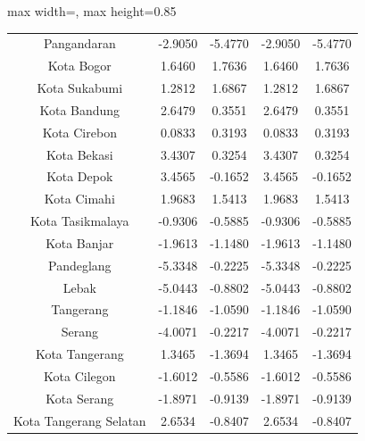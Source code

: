 \begin{table}[H]
\begin{adjustbox}{max width=\textwidth, max height=0.85\textheight}
\begin{tabular}{|c|c|c|c|c|}
Pangandaran & -2.9050 & -5.4770 & -2.9050 & -5.4770 \\
Kota Bogor & 1.6460 & 1.7636 & 1.6460 & 1.7636 \\
Kota Sukabumi & 1.2812 & 1.6867 & 1.2812 & 1.6867 \\
Kota Bandung & 2.6479 & 0.3551 & 2.6479 & 0.3551 \\
Kota Cirebon & 0.0833 & 0.3193 & 0.0833 & 0.3193 \\
Kota Bekasi & 3.4307 & 0.3254 & 3.4307 & 0.3254 \\
Kota Depok & 3.4565 & -0.1652 & 3.4565 & -0.1652 \\
Kota Cimahi & 1.9683 & 1.5413 & 1.9683 & 1.5413 \\
Kota Tasikmalaya & -0.9306 & -0.5885 & -0.9306 & -0.5885 \\
Kota Banjar & -1.9613 & -1.1480 & -1.9613 & -1.1480 \\
Pandeglang & -5.3348 & -0.2225 & -5.3348 & -0.2225 \\
Lebak & -5.0443 & -0.8802 & -5.0443 & -0.8802 \\
Tangerang & -1.1846 & -1.0590 & -1.1846 & -1.0590 \\
Serang & -4.0071 & -0.2217 & -4.0071 & -0.2217 \\
Kota Tangerang & 1.3465 & -1.3694 & 1.3465 & -1.3694 \\
Kota Cilegon & -1.6012 & -0.5586 & -1.6012 & -0.5586 \\
Kota Serang & -1.8971 & -0.9139 & -1.8971 & -0.9139 \\
Kota Tangerang Selatan & 2.6534 & -0.8407 & 2.6534 & -0.8407 \\
\hline
\end{tabular}
\end{adjustbox}
\end{table}